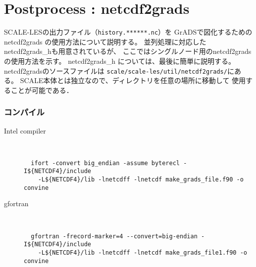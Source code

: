 \section{Postprocess : netcdf2grads}
\label{sec:net2g}

SCALE-LESの出力ファイル（\verb|history.******.nc|）を
GrADSで図化するためのnetcdf2grads の使用方法について説明する。
並列処理に対応したnetcdf2grads\_hも用意されているが、
ここではシングルノード用のnetcdf2gradsの使用方法を示す。
netcdf2grads\_h については、最後に簡単に説明する。
netcdf2gradsのソースファイルは \verb|scale/scale-les/util/netcdf2grads/|にある。
SCALE本体とは独立なので、ディレクトリを任意の場所に移動して
使用することが可能である．

\subsubsection{コンパイル}
\begin{description}
\item[Intel compiler]\mbox{}\\
 \begin{verbatim}
  ifort -convert big_endian -assume byterecl -I${NETCDF4}/include 
    -L${NETCDF4}/lib -lnetcdff -lnetcdf make_grads_file.f90 -o convine
  \end{verbatim}
\item[gfortran]\mbox{}\\
\begin{verbatim}
  gfortran -frecord-marker=4 --convert=big-endian -I${NETCDF4}/include
    -L${NETCDF4}/lib -lnetcdff -lnetcdf make_grads_file1.f90 -o convine
\end{verbatim}
\end{description}


